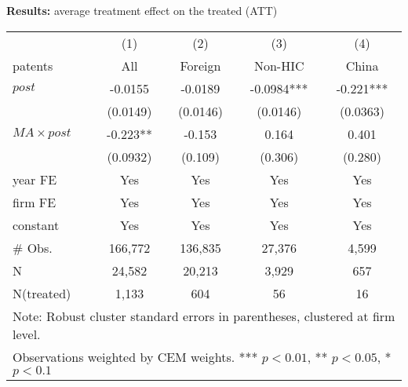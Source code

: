 \documentclass{beamer} %
\begin{document}
\begin{frame}{\textbf{Results:} average treatment effect on the treated (ATT)}
	\begin{table}[t!]
	\centering
	\begin{tabular}{lrrrr}
		\midrule
		& \multicolumn{1}{c}{(1)} & \multicolumn{1}{c}{(2)} & \multicolumn{1}{c}{(3)} & \multicolumn{1}{c}{(4)} \\
		patents & \multicolumn{1}{c}{All} & \multicolumn{1}{c}{Foreign} & \multicolumn{1}{c}{Non-HIC} & \multicolumn{1}{c}{China} \\
		\midrule
		$post$  & \multicolumn{1}{c}{	-0.0155} & \multicolumn{1}{c}{-0.0189} & \multicolumn{1}{c}{-0.0984***} & \multicolumn{1}{c}{-0.221***} \\
		& \multicolumn{1}{c}{(0.0149)} & \multicolumn{1}{c}{(0.0146)} & \multicolumn{1}{c}{(0.0146)} & \multicolumn{1}{c}{(0.0363)} \\
		$MA\times post$ & \multicolumn{1}{c}{-0.223**} & \multicolumn{1}{c}{ -0.153} & \multicolumn{1}{c}{0.164} & \multicolumn{1}{c}{0.401} \\
		& \multicolumn{1}{c}{(0.0932)} & \multicolumn{1}{c}{ (0.109)} & \multicolumn{1}{c}{(0.306)} & \multicolumn{1}{c}{(0.280)} \\
		\midrule
		year FE & \multicolumn{1}{c}{Yes} & \multicolumn{1}{c}{Yes} & \multicolumn{1}{c}{Yes} & \multicolumn{1}{c}{Yes} \\
		firm FE & \multicolumn{1}{c}{Yes} & \multicolumn{1}{c}{Yes} & \multicolumn{1}{c}{Yes} & \multicolumn{1}{c}{Yes} \\
		constant & \multicolumn{1}{c}{Yes} & \multicolumn{1}{c}{Yes} & \multicolumn{1}{c}{Yes} & \multicolumn{1}{c}{Yes} \\
		\midrule
		\# Obs. & \multicolumn{1}{c}{166,772} & \multicolumn{1}{c}{136,835} & \multicolumn{1}{c}{27,376} & \multicolumn{1}{c}{ 4,599} \\
		N     & \multicolumn{1}{c}{24,582} & \multicolumn{1}{c}{20,213} & \multicolumn{1}{c}{3,929} & \multicolumn{1}{c}{657} \\
		N(treated) & \multicolumn{1}{c}{1,133} & \multicolumn{1}{c}{604} & \multicolumn{1}{c}{56} & \multicolumn{1}{c}{16} \\
		\midrule
		\multicolumn{5}{l}{\footnotesize{Note: Robust cluster standard errors in parentheses, clustered at firm level.}}       \\
		\multicolumn{5}{l}{\footnotesize{Observations weighted by CEM weights. *** $p<0.01$, ** $p<0.05$, * $p<0.1$}}       \\
	\end{tabular}%
	\label{tab:did_att}%
    \end{table}%
    \hfill \hyperlink{robustness}{}
\end{frame}
\end{document}

